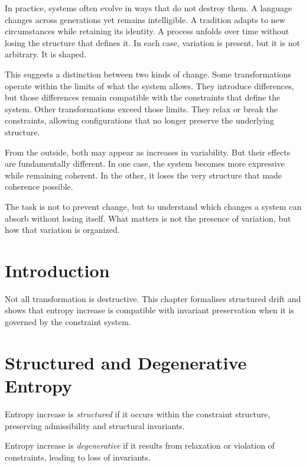 \documentclass[11pt,openany]{book}
\begin{document}
In practice, systems often evolve in ways that do not destroy them. A language changes across generations yet remains intelligible. A tradition adapts to new circumstances while retaining its identity. A process unfolds over time without losing the structure that defines it. In each case, variation is present, but it is not arbitrary. It is shaped.

This suggests a distinction between two kinds of change. Some transformations operate within the limits of what the system allows. They introduce differences, but those differences remain compatible with the constraints that define the system. Other transformations exceed those limits. They relax or break the constraints, allowing configurations that no longer preserve the underlying structure.

From the outside, both may appear as increases in variability. But their effects are fundamentally different. In one case, the system becomes more expressive while remaining coherent. In the other, it loses the very structure that made coherence possible.

The task is not to prevent change, but to understand which changes a system can absorb without losing itself. What matters is not the presence of variation, but how that variation is organized.

\section{Introduction}
\label{sec:introduction-drift}

Not all transformation is destructive. This chapter
formalises structured drift and shows that entropy increase
is compatible with invariant preservation when it is
governed by the constraint system.

\section{Structured and Degenerative Entropy}
\label{sec:structured-entropy}

\begin{definition}
Entropy increase is \emph{structured} if it occurs within
the constraint structure, preserving admissibility and
structural invariants.
\end{definition}

\begin{definition}
Entropy increase is \emph{degenerative} if it results from
relaxation or violation of constraints, leading to loss of
invariants.
\end{definition}
\end{document}
